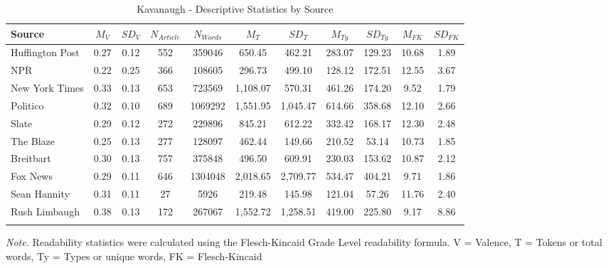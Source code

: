 \documentclass[
  english,
  man]{apa6}
\begin{document}
\begin{table}[tbp]

\begin{center}
\begin{threeparttable}

\caption{\label{tab:exp2-source-descriptives-kav}Kavanaugh - Descriptive Statistics by Source}

\footnotesize{

\begin{tabular}{lcccccccccc}
\toprule
Source & $M_V$ & $SD_V$ & $N_{Article}$ & $N_{Words}$ & $M_T$ & $SD_T$ & $M_{Ty}$ & $SD_{Ty}$ & $M_{FK}$ & $SD_{FK}$\\
\midrule
Huffington Post & 0.27 & 0.12 & 552 & 359046 & 650.45 & 462.21 & 283.07 & 129.23 & 10.68 & 1.89\\
NPR & 0.22 & 0.25 & 366 & 108605 & 296.73 & 499.10 & 128.12 & 172.51 & 12.55 & 3.67\\
New York Times & 0.33 & 0.13 & 653 & 723569 & 1,108.07 & 570.31 & 461.26 & 174.20 & 9.52 & 1.79\\
Politico & 0.32 & 0.10 & 689 & 1069292 & 1,551.95 & 1,045.47 & 614.66 & 358.68 & 12.10 & 2.66\\
Slate & 0.29 & 0.12 & 272 & 229896 & 845.21 & 612.22 & 332.42 & 168.17 & 12.30 & 2.48\\
The Blaze & 0.25 & 0.13 & 277 & 128097 & 462.44 & 149.66 & 210.52 & 53.14 & 10.73 & 1.85\\
Breitbart & 0.30 & 0.13 & 757 & 375848 & 496.50 & 609.91 & 230.03 & 153.62 & 10.87 & 2.12\\
Fox News & 0.29 & 0.11 & 646 & 1304048 & 2,018.65 & 2,709.77 & 534.47 & 404.21 & 9.71 & 1.86\\
Sean Hannity & 0.31 & 0.11 & 27 & 5926 & 219.48 & 145.98 & 121.04 & 57.26 & 11.76 & 2.40\\
Rush Limbaugh & 0.38 & 0.13 & 172 & 267067 & 1,552.72 & 1,258.51 & 419.00 & 225.80 & 9.17 & 8.86\\
\bottomrule
\addlinespace
\end{tabular}

}

\begin{tablenotes}[para]
\normalsize{\textit{Note.} Readability statistics were calculated using the Flesch-Kincaid Grade Level readability formula. V = Valence, T = Tokens or total words, Ty = Types or unique words, FK = Flesch-Kincaid}
\end{tablenotes}

\end{threeparttable}
\end{center}

\end{table}
\end{document}
